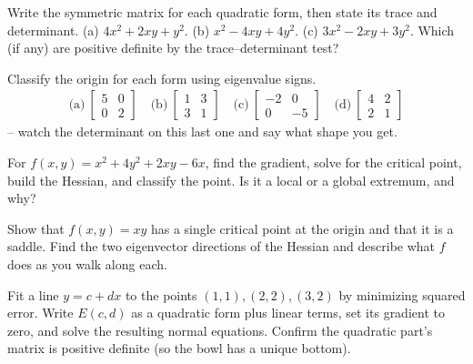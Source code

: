 \begin{exercise}
\label{ch36:exr-build}
Write the symmetric matrix for each quadratic form, then state its trace and
determinant. (a) $4x^2 + 2xy + y^2$. (b) $x^2 - 4xy + 4y^2$. (c) $3x^2 - 2xy + 3y^2$.
Which (if any) are positive definite by the trace--determinant test?
\end{exercise}

\begin{exercise}
\label{ch36:exr-classify}
Classify the origin for each form using eigenvalue signs.
\begin{align*}
  \text{(a)}~\begin{bmatrix}5&0\\0&2\end{bmatrix} \quad
  \text{(b)}~\begin{bmatrix}1&3\\3&1\end{bmatrix} \quad
  \text{(c)}~\begin{bmatrix}-2&0\\0&-5\end{bmatrix} \quad
  \text{(d)}~\begin{bmatrix}4&2\\2&1\end{bmatrix}
\end{align*}
-- watch the determinant on this last one and say what shape you get.
\end{exercise}

\begin{exercise}
\label{ch36:exr-critical}
For $f(x,y)=x^2 + 4y^2 + 2xy - 6x$, find the gradient, solve for the critical point,
build the Hessian, and classify the point. Is it a local or a global extremum, and
why?
\end{exercise}

\begin{exercise}
\label{ch36:exr-saddle}
Show that $f(x,y)=xy$ has a single critical point at the origin and that it is a
saddle. Find the two eigenvector directions of the Hessian and describe what $f$ does
as you walk along each.
\end{exercise}

\begin{exercise}
\label{ch36:exr-lsq}
Fit a line $y=c+dx$ to the points $(1,1),(2,2),(3,2)$ by minimizing squared error.
Write $E(c,d)$ as a quadratic form plus linear terms, set its gradient to zero, and
solve the resulting normal equations. Confirm the quadratic part's matrix is positive
definite (so the bowl has a unique bottom).
\end{exercise}

